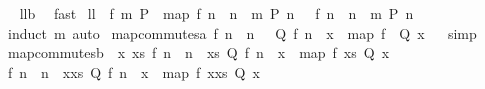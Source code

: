 \begin{isabellebody}
\isadelimproof
\ %
\endisadelimproof
%
\isatagproof
{}\isamarkupfalse%
\ ll{}b\ \isamarkupfalse%
\ fast%
\endisatagproof
{\isafoldproof}%
%
\isadelimproof
%
\endisadelimproof
\isanewline
\isanewline
\isanewline
{}\isamarkupfalse%
\ ll{}{}{\isacharcolon}\ \ f\ m\ P\ \ {\isachardoublequoteopen}{\isacharparenleft}map\ f\ {\isacharbrackleft}n\ {\isachardot}\ n\ {\isacharless}{\isacharminus}\ {\isacharbrackleft}{}{\isachardot}{\isachardot}{\isacharless}m{\isacharbrackright}{\isacharcomma}\ P\ n{\isacharbrackright}{\isacharparenright}\ {\isacharequal}\ {\isacharbrackleft}\ f\ n\ {\isachardot}\ n\ {\isacharless}{\isacharminus}\ {\isacharbrackleft}{}{\isachardot}{\isachardot}{\isacharless}m{\isacharbrackright}{\isacharcomma}\ P\ n{\isacharbrackright}{\isachardoublequoteclose}\ \isanewline
%
\isadelimproof
%
\endisadelimproof
%
\isatagproof
{}\isamarkupfalse%
\ {\isacharparenleft}induct\ m{\isacharparenright}\ auto%
\endisatagproof
{\isafoldproof}%
%
\isadelimproof
\isanewline
%
\endisadelimproof
\isanewline
{}\isamarkupfalse%
\ map{\isacharunderscore}commutes{\isacharunderscore}a{\isacharcolon}\ {\isachardoublequoteopen}{\isacharbrackleft}f\ n\ {\isachardot}\ n\ {\isacharless}{\isacharminus}\ {\isacharbrackleft}{\isacharbrackright}{\isacharcomma}\ Q\ {\isacharparenleft}f\ n{\isacharparenright}{\isacharbrackright}\ {\isacharequal}\ {\isacharbrackleft}x\ {\isacharless}{\isacharminus}\ {\isacharparenleft}map\ f\ {\isacharbrackleft}{\isacharbrackright}{\isacharparenright}{\isachardot}\ Q\ x{\isacharbrackright}{\isachardoublequoteclose}%
\isadelimproof
\ %
\endisadelimproof
%
\isatagproof
{}\isamarkupfalse%
\ simp%
\endisatagproof
{\isafoldproof}%
%
\isadelimproof
%
\endisadelimproof
\isanewline
\isanewline
{}\isamarkupfalse%
\ map{\isacharunderscore}commutes{\isacharunderscore}b{\isacharcolon}\ {\isachardoublequoteopen}{\isasymforall}\ x\ xs{\isachardot}\ {\isacharparenleft}{\isacharbrackleft}f\ n\ {\isachardot}\ n\ {\isacharless}{\isacharminus}\ xs{\isacharcomma}\ Q\ {\isacharparenleft}f\ n{\isacharparenright}{\isacharbrackright}\ {\isacharequal}\ {\isacharbrackleft}x\ {\isacharless}{\isacharminus}\ {\isacharparenleft}map\ f\ xs{\isacharparenright}{\isachardot}\ Q\ x{\isacharbrackright}\isanewline
{\isasymlongrightarrow}\ {\isacharbrackleft}f\ n\ {\isachardot}\ n\ {\isacharless}{\isacharminus}\ {\isacharparenleft}x{\isacharhash}xs{\isacharparenright}{\isacharcomma}\ Q\ {\isacharparenleft}f\ n{\isacharparenright}{\isacharbrackright}\ {\isacharequal}\ {\isacharbrackleft}x\ {\isacharless}{\isacharminus}\ {\isacharparenleft}map\ f\ {\isacharparenleft}x{\isacharhash}xs{\isacharparenright}{\isacharparenright}{\isachardot}\ Q\ x{\isacharbrackright}{\isacharparenright}{\isachardoublequoteclose}%

\end{isabellebody}
